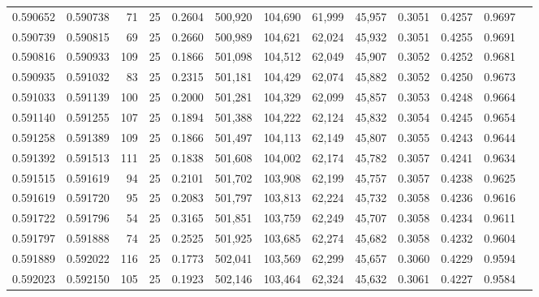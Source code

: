 \begin{tabular}{rrrrrrrrrrrrr}
0.590652 & 0.590738 &    71 &  25 &                                     0.2604 & 500,920 & 104,690 &  61,999 &  45,957 & 0.3051 & 0.4257 & 0.9697 \\
0.590739 & 0.590815 &    69 &  25 &                                     0.2660 & 500,989 & 104,621 &  62,024 &  45,932 & 0.3051 & 0.4255 & 0.9691 \\
0.590816 & 0.590933 &   109 &  25 &                                     0.1866 & 501,098 & 104,512 &  62,049 &  45,907 & 0.3052 & 0.4252 & 0.9681 \\
0.590935 & 0.591032 &    83 &  25 &                                     0.2315 & 501,181 & 104,429 &  62,074 &  45,882 & 0.3052 & 0.4250 & 0.9673 \\
0.591033 & 0.591139 &   100 &  25 &                                     0.2000 & 501,281 & 104,329 &  62,099 &  45,857 & 0.3053 & 0.4248 & 0.9664 \\
0.591140 & 0.591255 &   107 &  25 &                                     0.1894 & 501,388 & 104,222 &  62,124 &  45,832 & 0.3054 & 0.4245 & 0.9654 \\
0.591258 & 0.591389 &   109 &  25 &                                     0.1866 & 501,497 & 104,113 &  62,149 &  45,807 & 0.3055 & 0.4243 & 0.9644 \\
0.591392 & 0.591513 &   111 &  25 &                                     0.1838 & 501,608 & 104,002 &  62,174 &  45,782 & 0.3057 & 0.4241 & 0.9634 \\
0.591515 & 0.591619 &    94 &  25 &                                     0.2101 & 501,702 & 103,908 &  62,199 &  45,757 & 0.3057 & 0.4238 & 0.9625 \\
0.591619 & 0.591720 &    95 &  25 &                                     0.2083 & 501,797 & 103,813 &  62,224 &  45,732 & 0.3058 & 0.4236 & 0.9616 \\
0.591722 & 0.591796 &    54 &  25 &                                     0.3165 & 501,851 & 103,759 &  62,249 &  45,707 & 0.3058 & 0.4234 & 0.9611 \\
0.591797 & 0.591888 &    74 &  25 &                                     0.2525 & 501,925 & 103,685 &  62,274 &  45,682 & 0.3058 & 0.4232 & 0.9604 \\
0.591889 & 0.592022 &   116 &  25 &                                     0.1773 & 502,041 & 103,569 &  62,299 &  45,657 & 0.3060 & 0.4229 & 0.9594 \\
0.592023 & 0.592150 &   105 &  25 &                                     0.1923 & 502,146 & 103,464 &  62,324 &  45,632 & 0.3061 & 0.4227 & 0.9584 \\

\end{tabular}
